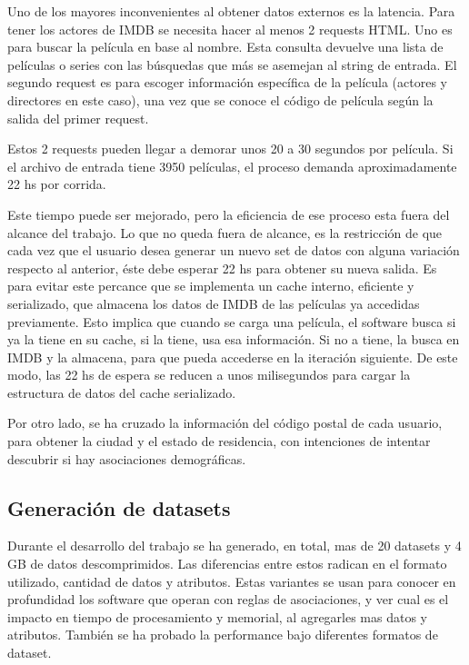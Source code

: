 \documentclass[journal]{IEEEtran}
\begin{document}
Uno de los mayores inconvenientes al obtener datos externos es la latencia. Para tener
los actores de IMDB se necesita hacer al menos 2 requests HTML. Uno es para buscar la
película en base al nombre. Esta consulta devuelve una lista de películas o series con
las búsquedas que más se asemejan al string de entrada. El segundo request es para 
escoger información específica de la película (actores y directores en este caso), una vez
que se conoce el código de película según la salida del primer request.

Estos 2 requests pueden llegar a demorar unos 20 a 30 segundos por película. Si el archivo de
entrada tiene 3950 películas, el proceso demanda aproximadamente 22 hs por corrida.

Este tiempo puede ser mejorado, pero la eficiencia de ese proceso esta fuera del alcance del trabajo.
Lo que no queda fuera de alcance, es la restricción de que cada vez que el usuario desea
generar un nuevo set de datos con alguna variación respecto al anterior, éste debe esperar
22 hs para obtener su nueva salida. Es para evitar este percance que se implementa un cache interno, 
eficiente y serializado, que almacena los datos de IMDB de las películas ya accedidas previamente.
Esto implica que cuando se carga una película, el software busca si ya la tiene en su cache,
 si la tiene, usa esa información. Si no a tiene, la busca en IMDB y la almacena, para que 
pueda accederse en la iteración siguiente. De este modo, las 22 hs de espera se reducen a
unos milisegundos para cargar la estructura de datos del cache serializado.

Por otro lado, se ha cruzado la información del código postal de cada usuario, para
obtener la ciudad y el estado de residencia, con intenciones de intentar descubrir
si hay asociaciones demográficas.

\subsection{Generación de datasets}
Durante el desarrollo del trabajo se ha generado, en total, mas de 20 datasets y 4 GB de datos descomprimidos. 
Las diferencias entre estos radican en el formato utilizado, cantidad de datos y atributos. Estas variantes se
usan para conocer en profundidad los software que operan con reglas de asociaciones, y
ver cual es el impacto en tiempo de procesamiento y memorial, al agregarles mas
datos y atributos.
También se ha probado la performance bajo diferentes formatos de dataset.
\end{document}
